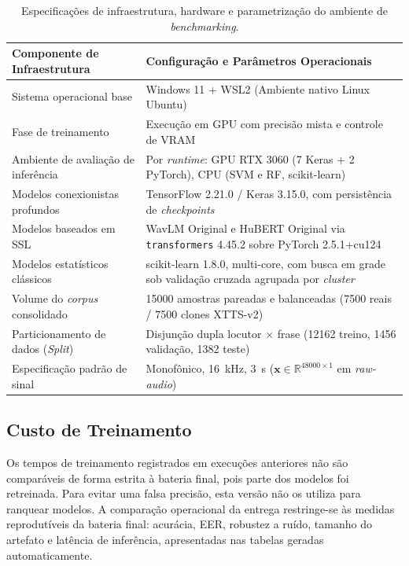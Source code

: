 \documentclass[12pt,a4paper]{article}
\begin{document}
\begin{table}[H]
	\centering
	\caption{Especificações de infraestrutura, hardware e parametrização do ambiente de \textit{benchmarking}.}
	\label{tab:hardware_benchmark}
	\small\singlespacing
	\setlength{\tabcolsep}{4pt}
	\begin{tabular}{@{}>{\raggedright\arraybackslash}p{4.2cm}
			>{\raggedright\arraybackslash}p{10.5cm}@{}}
		\toprule
		\textbf{Componente de Infraestrutura} & \textbf{Configuração e Parâmetros Operacionais} \\
		\midrule
		Sistema operacional base & Windows 11 + WSL2 (Ambiente nativo Linux Ubuntu) \\
		Fase de treinamento & Execução em GPU com precisão mista e controle de VRAM \\
		Ambiente de avaliação de inferência & Por \textit{runtime}: GPU RTX 3060 (7 Keras + 2 PyTorch), CPU (SVM e RF, scikit-learn) \\
		Modelos conexionistas profundos & TensorFlow 2.21.0 / Keras 3.15.0, com persistência de \textit{checkpoints} \\
		Modelos baseados em SSL & WavLM Original e HuBERT Original via \texttt{transformers} 4.45.2 sobre PyTorch 2.5.1+cu124 \\
		Modelos estatísticos clássicos & scikit-learn 1.8.0, multi-core, com busca em grade sob validação cruzada agrupada por \textit{cluster} \\
		Volume do \textit{corpus} consolidado & \num{15000} amostras pareadas e balanceadas (\num[group-minimum-digits=4]{7500} reais / \num[group-minimum-digits=4]{7500} clones XTTS-v2) \\
		Particionamento de dados (\textit{Split}) & Disjunção dupla locutor $\times$ frase (\num[group-minimum-digits=4]{12162} treino, \num[group-minimum-digits=4]{1456} validação, \num[group-minimum-digits=4]{1382} teste) \\
		Especificação padrão de sinal & Monofônico, \SI{16}{\kilo\hertz}, \SI{3}{\second} ($\mathbf{x} \in \mathbb{R}^{\num{48000} \times 1}$ em \textit{raw-audio}) \\
		\bottomrule
	\end{tabular}
\end{table}

\subsection{Custo de Treinamento}
\label{sec:custo_treino}

Os tempos de treinamento registrados em execuções anteriores não são
comparáveis de forma estrita à bateria final, pois parte dos modelos foi
retreinada. Para evitar uma falsa precisão, esta versão não os utiliza para
ranquear modelos. A comparação operacional da entrega restringe-se às medidas
reprodutíveis da bateria final: acurácia, EER, robustez a ruído, tamanho do
artefato e latência de inferência, apresentadas nas tabelas geradas
automaticamente.
\label{tab:tempo_treinamento}
\end{document}

